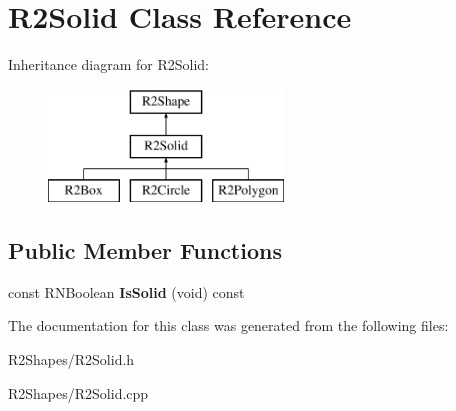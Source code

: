 \hypertarget{class_r2_solid}{}\section{R2\+Solid Class Reference}
\label{class_r2_solid}
Inheritance diagram for R2\+Solid\+:\begin{figure}[H]
\begin{center}
\leavevmode
\includegraphics[height=3.000000cm]{class_r2_solid}
\end{center}
\end{figure}
\subsection*{Public Member Functions}
\begin{DoxyCompactItemize}
\item 
const R\+N\+Boolean {\bfseries Is\+Solid} (void) const \hypertarget{class_r2_solid_a52bcc096ca5bf67e4880cce983a85145}{}\label{class_r2_solid_a52bcc096ca5bf67e4880cce983a85145}

\end{DoxyCompactItemize}


The documentation for this class was generated from the following files\+:\begin{DoxyCompactItemize}
\item 
R2\+Shapes/R2\+Solid.\+h\item 
R2\+Shapes/R2\+Solid.\+cpp\end{DoxyCompactItemize}
